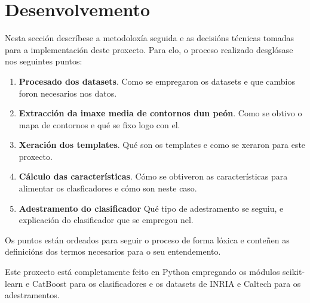 \documentclass[galician]{./head/uvigo-tfg}
\begin{document}
    \section{Desenvolvemento}
    Nesta sección descríbese a metodoloxía seguida e as decisións técnicas tomadas para a implementación deste proxecto. Para elo, o proceso realizado desglósase nos seguintes puntos:
    \begin{enumerate}
        \item \textbf{Procesado dos datasets}. Como se empregaron os datasets e que cambios foron necesarios nos datos.
        \item \textbf{Extracción da imaxe media de contornos dun peón}. Como se obtivo o mapa de contornos e qué se fixo logo con el.
        \item \textbf{Xeración dos templates}. Qué son os templates e como se xeraron para este proxecto.
        \item \textbf{Cálculo das características}. Cómo se obtiveron as características para alimentar os clasficadores e cómo son neste caso.
        \item \textbf{Adestramento do clasificador} Qué tipo de adestramento se seguiu, e explicación do clasificador que se empregou nel.
    \end{enumerate}
     \par Os puntos están ordeados para seguir o proceso de forma lóxica e conteñen as definicións dos termos necesarios para o seu entendemento.
    \par Este proxecto está completamente feito en Python empregando os módulos scikit-learn\cite{scikit-learn} e CatBoost\cite{CatBoost} para os clasificadores e os datasets de INRIA\cite{inria} e Caltech\cite{caltech} para os adestramentos.
\end{document}
